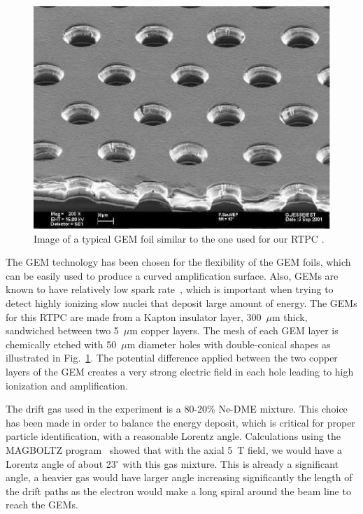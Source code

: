 \documentclass[preprint,5p]{elsarticle}
\begin{document}
\begin{figure}[tbp]
\centering
\includegraphics[scale=0.70]{fig/GEM_photo.jpg}
\caption{Image of a typical GEM foil similar to the one used for our RTPC 
\cite{GEM_ref_pic}.} 
   \label{fig:GEMs}
\end{figure}

The GEM technology has been chosen for the flexibility of the GEM foils,
which can be easily used to produce a curved amplification surface. Also, 
GEMs are known to have relatively low spark rate~\cite{GEM_ref}, which 
is important when trying to detect 
highly ionizing slow nuclei that deposit large amount of energy. The GEMs for 
this RTPC are made from a Kapton insulator layer, 300~$\mu$m 
thick, sandwiched between two 5~$\mu$m copper layers. The mesh of each GEM 
layer is chemically etched with 50~$\mu$m diameter holes with double-conical 
shapes as illustrated in Fig.~\ref{fig:GEMs}. The potential difference 
applied between the two copper layers of the GEM creates a very strong 
electric field in each hole leading to high ionization and amplification. 

The drift gas used in the experiment is a 80-20\% Ne-DME mixture. This choice 
has been made in order to balance the energy deposit, which is critical
for proper particle identification, with a reasonable
Lorentz angle. Calculations using the MAGBOLTZ program~\cite{MAGBOLTZ} 
showed that with the axial 5~T field, we would have a Lorentz angle of 
about 23$^\circ$ with this gas mixture. This is already a significant angle,
a heavier gas would have larger angle increasing significantly
the length of the drift paths as the electron would 
make a long spiral around the beam line to reach the GEMs. 
\end{document}
